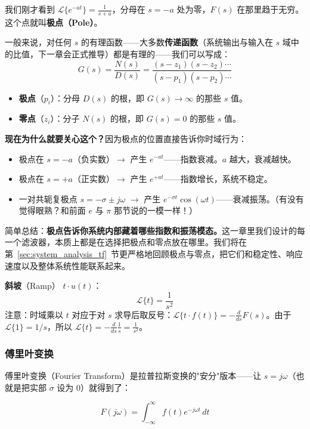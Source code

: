 我们刚才看到 $\mathcal{L}\{e^{-at}\} = \frac{1}{s+a}$，分母在 $s = -a$ 处为零，$F(s)$ 在那里趋于无穷。这个点就叫\textbf{极点（Pole）}。

一般来说，对任何 $s$ 的有理函数——大多数\textbf{传递函数}（系统输出与输入在 $s$ 域中的比值，下一章会正式推导）都是有理的——我们可以写成：
\[
G(s) = \frac{N(s)}{D(s)} = \frac{(s - z_1)(s - z_2) \cdots}{(s - p_1)(s - p_2) \cdots}
\]
\begin{itemize}[nosep]
    \item \textbf{极点}（$p_i$）：分母 $D(s)$ 的根，即 $G(s) \to \infty$ 的那些 $s$ 值。
    \item \textbf{零点}（$z_i$）：分子 $N(s)$ 的根，即 $G(s) = 0$ 的那些 $s$ 值。
\end{itemize}

\textbf{现在为什么就要关心这个？}因为极点的位置直接告诉你时域行为：
\begin{itemize}[nosep]
    \item 极点在 $s = -a$（负实数）$\to$ 产生 $e^{-at}$——指数衰减。$a$ 越大，衰减越快。
    \item 极点在 $s = +a$（正实数）$\to$ 产生 $e^{+at}$——指数增长，系统不稳定。
    \item 一对共轭复极点 $s = -\sigma \pm j\omega$ $\to$ 产生 $e^{-\sigma t}\cos(\omega t)$——衰减振荡。（有没有觉得眼熟？和前面 $e$ 与 $\pi$ 那节说的一模一样！）
\end{itemize}

简单总结：\textbf{极点告诉你系统内部藏着哪些指数和振荡模态。}这一章里我们设计的每一个滤波器，本质上都是在选择把极点和零点放在哪里。我们将在第~\ref{sec:system_analysis_tf}~节更严格地回顾极点与零点，把它们和稳定性、响应速度以及整体系统性能联系起来。

\textbf{斜坡}（Ramp） $t \cdot u(t)$：
\[
\mathcal{L}\{t\} = \frac{1}{s^2}
\]
注意：时域乘以 $t$ 对应于对 $s$ 求导后取反号：$\mathcal{L}\{t \cdot f(t)\} = -\frac{d}{ds}F(s)$。由于 $\mathcal{L}\{1\} = 1/s$，所以 $\mathcal{L}\{t\} = -\frac{d}{ds}\frac{1}{s} = \frac{1}{s^2}$。

\subsubsection{傅里叶变换}

傅里叶变换（Fourier Transform）是拉普拉斯变换的"安分"版本——让 $s = j\omega$（也就是把实部 $\sigma$ 设为 0）就得到了：

\begin{equation}
F(j\omega) = \int_{-\infty}^{\infty} f(t) e^{-j\omega t} \, dt
\end{equation}

